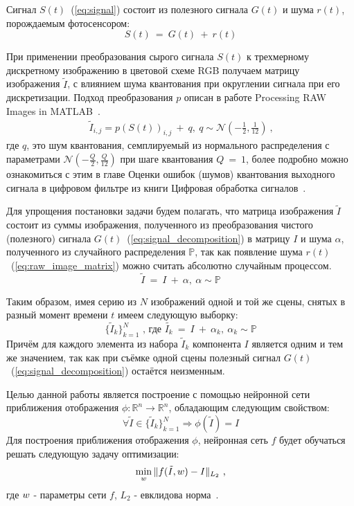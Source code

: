 Сигнал $S(t)$~(\ref{eq:signal}) состоит из полезного сигнала $G(t)$ и шума $r(t)$, порождаемым фотосенсором:
\begin{equation}\label{eq:signal_decomposition}
S(t)\ =\ G(t)\ +\ r(t)
\end{equation}

При применении преобразования сырого сигнала $S(t)$ к трехмерному дискретному изображению в цветовой схеме RGB получаем матрицу изображения  $\tilde{I}$, с влиянием шума квантования при округлении сигнала при его дискретизации. Подход преобразования $p$ описан в работе Processing RAW Images in MATLAB~\autocite{RAWtoRGB}.
\begin{eqnarray}\label{eq:raw_image_matrix}
\tilde{I}_{i,j} = p(S(t))_{i, j}\ +\ q,\ q  \sim \mathcal{N}(-\frac{1}{2}, \frac{1}{12})\ \text{,}
\end{eqnarray}
где $q$, это шум квантования, семплируемый из нормального распределения с параметрами $\mathcal{N}(-\frac{Q}{2}, \frac{Q}{12})$ при шаге квантования $Q\ =\ 1$, более подробно можно ознакомиться с этим в главе Оценки ошибок (шумов) квантования выходного сигнала в цифровом фильтре из книги Цифровая обработка сигналов~\autocite{DSP}.

Для упрощения постановки задачи будем полагать, что матрица изображения $\tilde{I}$ состоит из суммы изображения, полученного из преобразования чистого (полезного) сигнала $G(t)$~(\ref{eq:signal_decomposition}) в матрицу $I$ и шума $\alpha$, полученного из случайного распределения $\mathbb{P}$, так как появление шума $r(t)$~(\ref{eq:raw_image_matrix}) можно считать абсолютно случайным процессом.
\begin{equation}\label{eq:matrix_def}
\tilde{I}\ =\ I\ +\ \alpha,\ \alpha \sim \mathbb{P}
\end{equation}

Таким образом, имея серию из $N$ изображений одной и той же сцены, снятых в разный момент времени $t$ имеем следующую выборку:
\begin{equation}\label{eq:collection}
\{\tilde{I}_k\}_{k=1}^{N}\text{ , где }\tilde{I_k}\ =\  I\ +\ \alpha_k,\ \alpha_k \sim \mathbb{P}
\end{equation}
Причём для каждого элемента из набора $\tilde{I}_k$ компонента $I$ является одним и тем же значением, так как при съёмке одной сцены полезный сигнал $G(t)$~(\ref{eq:signal_decomposition}) остаётся неизменным.

Целью данной работы является построение с помощью нейронной сети приближения отображения $\phi: \mathbb{R}^n \longrightarrow \mathbb{R}^n$, обладающим следующим свойством:
\begin{equation}\label{eq:main_property}
\forall \tilde{I} \in \{\tilde{I}_k\}_{k=1}^{N} \Longrightarrow \phi(\tilde{I}) = I 
\end{equation}
Для построения приближения отображения $\phi$, нейронная сеть $f$ будет обучаться решать следующую задачу оптимизации:
\begin{eqnarray}\label{eq:main_min_task}
\min_{\mathnormal{w}} \Arrowvert f(\tilde{I}, \mathnormal{w}) - I \Arrowvert_{L_2}\text{ ,}
\end{eqnarray}
где $\mathnormal{w}$ - параметры сети $f$, $L_2$ - евклидова норма~\autocite{Haykin}.


